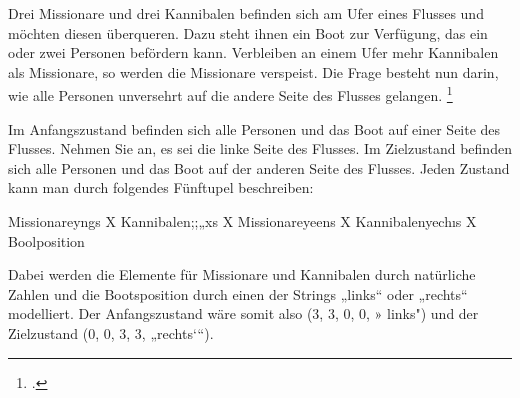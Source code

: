 \documentclass{bschlangaul-aufgabe}
\begin{document}

Drei Missionare und drei Kannibalen befinden sich am Ufer eines Flusses
und möchten diesen überqueren. Dazu steht ihnen ein Boot zur Verfügung,
das ein oder zwei Personen befördern kann. Verbleiben an einem Ufer mehr
Kannibalen als Missionare, so werden die Missionare verspeist. Die Frage
besteht nun darin, wie alle Personen unversehrt auf die andere Seite des
Flusses gelangen.
\footcite{examen:66115:2013:03}

Im Anfangszustand befinden sich alle Personen und das Boot auf einer
Seite des Flusses. Nehmen Sie an, es sei die linke Seite des Flusses. Im
Zielzustand befinden sich alle Personen und das Boot auf der anderen
Seite des Flusses. Jeden Zustand kann man durch folgendes Fünftupel
beschreiben:

Missionareyngs X Kannibalen;;„xs X Missionareyeens X Kannibalenyechıs X
Boolposition

Dabei werden die Elemente für Missionare und Kannibalen durch natürliche
Zahlen und die Bootsposition durch einen der Strings „links“ oder
„rechts“ modelliert. Der Anfangszustand wäre somit also (3, 3, 0, 0, »
links") und der Zielzustand (0, 0, 3, 3, „rechts‘“).
\end{document}
